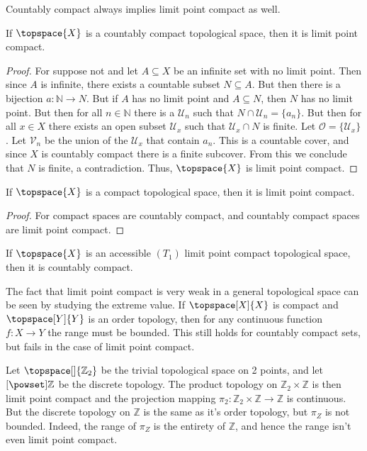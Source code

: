     Countably compact always implies limit point compact as well.
    \begin{theorem}
        If $\topspace{X}$ is a countably compact topological space, then it
        is limit point compact.
    \end{theorem}
    \begin{proof}
        For suppose not and let $A\subseteq{X}$ be an infinite set with no
        limit point. Then since $A$ is infinite, there exists a countable
        subset $N\subseteq{A}$. But then there is a bijection
        $a:\mathbb{N}\rightarrow{N}$. But if $A$ has no limit point and
        $A\subseteq{N}$, then $N$ has no limit point. But then for all
        $n\in\mathbb{N}$ there is a $\mathcal{U}_{n}$ such that
        $N\cap\mathcal{U}_{n}=\{a_{n}\}$. But then for all $x\in{X}$ there
        exists an open subset $\mathcal{U}_{x}$ such that
        $\mathcal{U}_{x}\cap{N}$ is finite. Let
        $\mathcal{O}=\{\mathcal{U}_{x}\}$. Let $\mathcal{V}_{n}$ be the
        union of the $\mathcal{U}_{x}$ that contain $a_{n}$. This is a
        countable cover, and since $X$ is countably compact there is a
        finite subcover. From this we conclude that $N$ is finite, a
        contradiction. Thus, $\topspace{X}$ is limit point compact.
    \end{proof}
    \begin{theorem}
        If $\topspace{X}$ is a compact topological space, then it is limit
        point compact.
    \end{theorem}
    \begin{proof}
        For compact spaces are countably compact, and countably compact
        spaces are limit point compact.
    \end{proof}
    \begin{theorem}
        If $\topspace{X}$ is an accessible $(T_{1})$ limit point compact
        topological space, then it is countably compact.
    \end{theorem}
    The fact that limit point compact is very weak in a general topological
    space can be seen by studying the extreme value. If
    $\topspace[X]{X}$ is compact and $\topspace[Y]{Y}$ is an order topology,
    then for any continuous function $f:X\rightarrow{Y}$ the range must be
    bounded. This still holds for countably compact sets, but fails in the
    case of limit point compact.
    \begin{example}
        Let $\topspace[\empty]{\mathbb{Z}_{2}}$ be the trivial topological
        space on 2 points, and let $\mathcal[\powset]{\mathbb{Z}}$ be the
        discrete topology. The product topology on
        $\mathbb{Z}_{2}\times\mathbb{Z}$ is then limit point compact and the
        projection mapping
        $\pi_{2}:\mathbb{Z}_{2}\times\mathbb{Z}\rightarrow\mathbb{Z}$ is
        continuous. But the discrete topology on $\mathbb{Z}$ is the same as
        it's order topology, but $\pi_{Z}$ is not bounded. Indeed, the range
        of $\pi_{Z}$ is the entirety of $\mathbb{Z}$, and hence the range
        isn't even limit point compact.
    \end{example}
